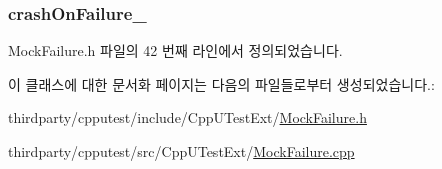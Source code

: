 \subsubsection[{\texorpdfstring{crash\+On\+Failure\+\_\+}{crashOnFailure_}}]{ crash\+On\+Failure\+\_\+\hspace{0.3cm}{\ttfamily [protected]}}\hypertarget{class_mock_failure_reporter_a9faf961cbe6687577f4eaae4625bcbea}{}\label{class_mock_failure_reporter_a9faf961cbe6687577f4eaae4625bcbea}


Mock\+Failure.\+h 파일의 42 번째 라인에서 정의되었습니다.



이 클래스에 대한 문서화 페이지는 다음의 파일들로부터 생성되었습니다.\+:\begin{DoxyCompactItemize}
\item 
thirdparty/cpputest/include/\+Cpp\+U\+Test\+Ext/\hyperlink{_mock_failure_8h}{Mock\+Failure.\+h}\item 
thirdparty/cpputest/src/\+Cpp\+U\+Test\+Ext/\hyperlink{_mock_failure_8cpp}{Mock\+Failure.\+cpp}\end{DoxyCompactItemize}
